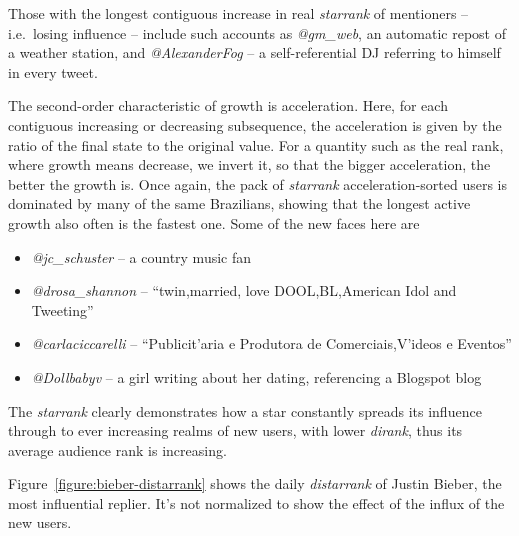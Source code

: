 \documentclass[10pt,oneside]{memoir}
\begin{document}
Those with the longest contiguous increase in real {\itshape starrank} of mentioners -- i.e.\ losing influence -- include such accounts as \emph{@gm\_web}, an automatic repost of a weather station, and {\itshape @AlexanderFog} -- a self-referential DJ referring to himself in every tweet.


The second-order characteristic of growth is acceleration.  Here, for each contiguous increasing or decreasing subsequence, the acceleration is given by the ratio of the final state to the original value.  For a quantity such as the real rank, where growth means decrease, we invert it, so that the bigger acceleration, the better the growth is.  Once again, the pack of {\itshape starrank} acceleration-sorted users is dominated by many of the same Brazilians, showing that the longest active growth also often is the fastest one.  Some of the new faces here are


\begin{itemize}


\item \emph{@jc\_schuster} -- a country music fan

\item \emph{@drosa\_shannon} -- ``twin,married, love DOOL,BL,American Idol and Tweeting''

\item {\itshape @carlaciccarelli} -- ``Publicit'{a}ria e Produtora de Comerciais,V'{i}deos e Eventos''

\item {\itshape @Dollbabyv} -- a girl writing about her dating, referencing a Blogspot blog
\end{itemize}

The {\itshape starrank} clearly demonstrates how a star constantly spreads its influence through to ever increasing realms of new users, with lower {\itshape dirank}, thus its average audience rank is increasing.  


Figure~\ref{figure:bieber-distarrank} shows the daily {\itshape distarrank} of Justin Bieber, the most influential replier.  It's not normalized to show the effect of the influx of the new users.



\end{document}
